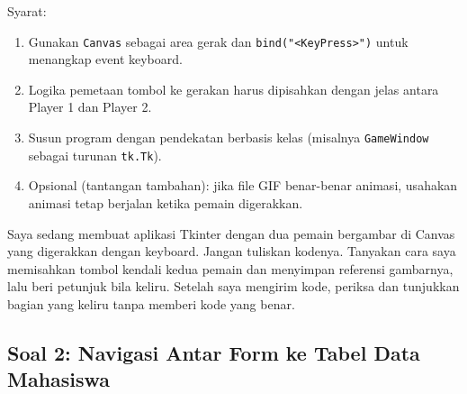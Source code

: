 Syarat:
\begin{enumerate}
    \item Gunakan \texttt{Canvas} sebagai area gerak dan \texttt{bind("<KeyPress>")} untuk menangkap event keyboard.
    \item Logika pemetaan tombol ke gerakan harus dipisahkan dengan jelas antara Player 1 dan Player 2.
    \item Susun program dengan pendekatan berbasis kelas (misalnya \texttt{GameWindow} sebagai turunan \texttt{tk.Tk}).
    \item Opsional (tantangan tambahan): jika file GIF benar-benar animasi, usahakan animasi tetap berjalan ketika pemain digerakkan.
\end{enumerate}

\begin{promptterarah}
Saya sedang membuat aplikasi Tkinter dengan dua pemain bergambar di Canvas yang digerakkan dengan keyboard. Jangan tuliskan kodenya. Tanyakan cara saya memisahkan tombol kendali kedua pemain dan menyimpan referensi gambarnya, lalu beri petunjuk bila keliru. Setelah saya mengirim kode, periksa dan tunjukkan bagian yang keliru tanpa memberi kode yang benar.
\end{promptterarah}


\subsection*{Soal 2: Navigasi Antar Form ke Tabel Data Mahasiswa}

